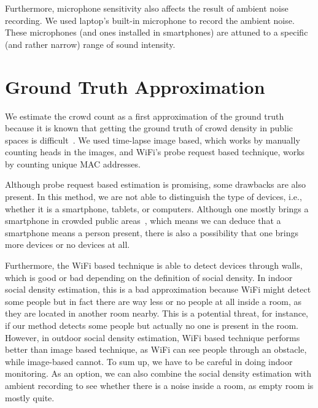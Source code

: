 Furthermore, microphone sensitivity also affects the result of ambient noise recording. We used laptop's built-in microphone to record the ambient noise. These microphones (and ones installed in smartphones) are attuned to a specific (and rather narrow) range of sound intensity.




\section{Ground Truth Approximation} %
\label{sec:ground_truth_approximation}
We estimate the crowd count as a first approximation of the ground truth because it is known that getting the ground truth of crowd density in public spaces is difficult~\cite{thesis041}. We used time-lapse image based, which works by manually counting heads in the images, and WiFi's probe request based technique, works by counting unique \ac{MAC} addresses.

Although probe request based estimation is promising, some drawbacks are also present. In this method, we are not able to distinguish the type of devices, i.e., whether it is a smartphone, tablets, or computers. Although one mostly brings a smartphone in crowded public areas~\cite{thesis047}, which means we can deduce that a smartphone means a person present, there is also a possibility that one brings more devices or no devices at all.

Furthermore, the WiFi based technique is able to detect devices through walls, which is good or bad depending on the definition of social density. In indoor social density estimation, this is a bad approximation because WiFi might detect some people but in fact there are way less or no people at all inside a room, as they are located in another room nearby. This is a potential threat, for instance, if our method detects some people but actually no one is present in the room. However, in outdoor social density estimation, WiFi based technique performs better than image based technique, as WiFi can see people through an obstacle, while image-based cannot. To sum up, we have to be careful in doing indoor monitoring. As an option, we can also combine the social density estimation with ambient recording to see whether there is a noise inside a room, as empty room is mostly quite. 

